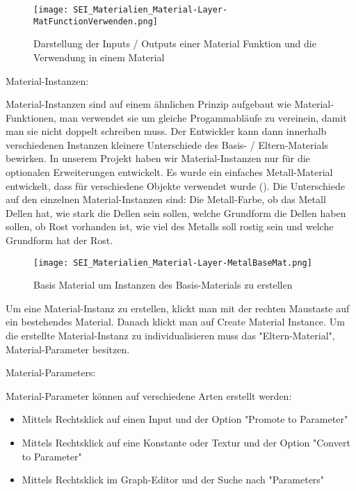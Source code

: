 {{\begin{figure}[H]
\centering
\texttt{[image: SEI\_Materialien\_Material-Layer-MatFunctionVerwenden.png]}
\caption{Darstellung der Inputs / Outputs einer Material Funktion und die Verwendung in einem Material}
\label{picture:use_mat_func}
\end{figure}

Material-Instanzen\citep{ue:mat_instances}:

Material-Instanzen sind auf einem ähnlichen Prinzip aufgebaut wie Material-Funktionen, man verwendet sie um gleiche
Progammabläufe zu vereinein, damit man sie nicht doppelt schreiben muss. Der Entwickler kann dann innerhalb
verschiedenen Instanzen kleinere Unterschiede des Basis- / Eltern-Materials bewirken. In unserem Projekt haben wir
Material-Instanzen nur für die optionalen Erweiterungen entwickelt. Es wurde ein einfaches Metall-Material entwickelt,
dass für verschiedene Objekte verwendet wurde (). Die Unterschiede auf
den einzelnen Material-Instanzen sind: Die Metall-Farbe, ob das Metall Dellen hat, wie stark die Dellen sein sollen,
welche Grundform die Dellen haben sollen, ob Rost vorhanden ist, wie viel des Metalls soll rostig sein und welche
Grundform hat der Rost.

\begin{figure}[H]
\centering
\texttt{[image: SEI\_Materialien\_Material-Layer-MetalBaseMat.png]}
\caption{Basis Material um Instanzen des Basis-Materials zu erstellen}
\label{picture:base_metal_material}
\end{figure}

Um eine Material-Instanz zu erstellen, klickt man mit der rechten Maustaste auf ein bestehendes Material. Danach klickt
man auf Create Material Instance. Um die erstellte Material-Instanz zu individualisieren muss das "Eltern-Material",
Material-Parameter besitzen.

Material-Parameters:

Material-Parameter können auf verschiedene Arten erstellt werden:
\begin{itemize}
\item  Mittels Rechtsklick auf einen Input und der Option "Promote to Parameter"
\item  Mittels Rechtsklick auf eine Konstante oder Textur und der Option "Convert to Parameter"
\item  Mittels Rechtsklick im Graph-Editor und der Suche nach "Parameters"
\end{itemize}

}}
